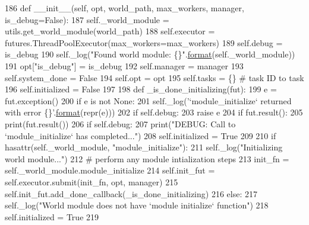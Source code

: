 \begin{DoxyCode}
186     \textcolor{keyword}{def }\_\_init\_\_(self, opt, world\_path, max\_workers, manager, is\_debug=False):
187         self.\_world\_module = utils.get\_world\_module(world\_path)
188         self.executor = futures.ThreadPoolExecutor(max\_workers=max\_workers)
189         self.debug = is\_debug
190         self.\_log(\textcolor{stringliteral}{"Found world module: \{\}"}.\hyperlink{namespaceparlai_1_1chat__service_1_1services_1_1messenger_1_1shared__utils_a32e2e2022b824fbaf80c747160b52a76}{format}(self.\_world\_module))
191         opt[\textcolor{stringliteral}{"is\_debug"}] = is\_debug
192         self.manager = manager
193         self.system\_done = \textcolor{keyword}{False}
194         self.opt = opt
195         self.tasks = \{\}  \textcolor{comment}{# task ID to task}
196         self.initialized = \textcolor{keyword}{False}
197 
198         \textcolor{keyword}{def }\_is\_done\_initializing(fut):
199             e = fut.exception()
200             \textcolor{keywordflow}{if} e \textcolor{keywordflow}{is} \textcolor{keywordflow}{not} \textcolor{keywordtype}{None}:
201                 self.\_log(\textcolor{stringliteral}{'`module\_initialize` returned with error \{\}'}.\hyperlink{namespaceparlai_1_1chat__service_1_1services_1_1messenger_1_1shared__utils_a32e2e2022b824fbaf80c747160b52a76}{format}(repr(e)))
202                 \textcolor{keywordflow}{if} self.debug:
203                     \textcolor{keywordflow}{raise} e
204             \textcolor{keywordflow}{if} fut.result():
205                 print(fut.result())
206             \textcolor{keywordflow}{if} self.debug:
207                 print(\textcolor{stringliteral}{"DEBUG: Call to `module\_initialize` has completed..."})
208             self.initialized = \textcolor{keyword}{True}
209 
210         \textcolor{keywordflow}{if} hasattr(self.\_world\_module, \textcolor{stringliteral}{"module\_initialize"}):
211             self.\_log(\textcolor{stringliteral}{"Initializing world module..."})
212             \textcolor{comment}{# perform any module intialization steps}
213             init\_fn = self.\_world\_module.module\_initialize
214             self.init\_fut = self.executor.submit(init\_fn, opt, manager)
215             self.init\_fut.add\_done\_callback(\_is\_done\_initializing)
216         \textcolor{keywordflow}{else}:
217             self.\_log(\textcolor{stringliteral}{"World module does not have `module initialize` function"})
218             self.initialized = \textcolor{keyword}{True}
219 
\end{DoxyCode}



